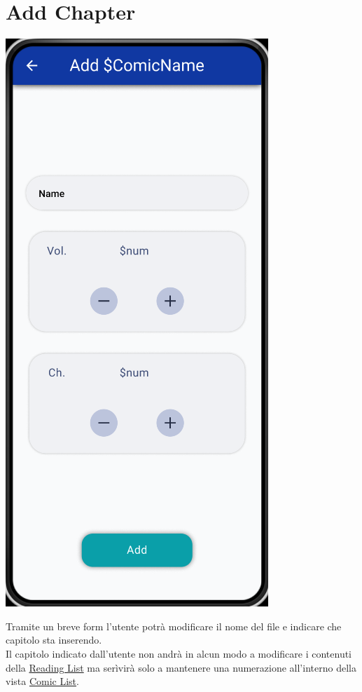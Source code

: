 \documentclass{report}
\begin{document}
\section{Add Chapter}\label{sec:add_chapter}

\begin{center}
  \includegraphics[scale=0.4]{add_chapter.png}
\end{center}

Tramite un breve form l'utente potrà modificare il nome del file e indicare che capitolo sta inserendo.\\
Il capitolo indicato dall'utente non andrà in alcun modo a modificare i contenuti della \hyperref[sec:reading_list]{Reading List} ma serìvirà solo a mantenere una numerazione all'interno della vista \hyperref[sec:comic_list]{Comic List}.
\end{document}
